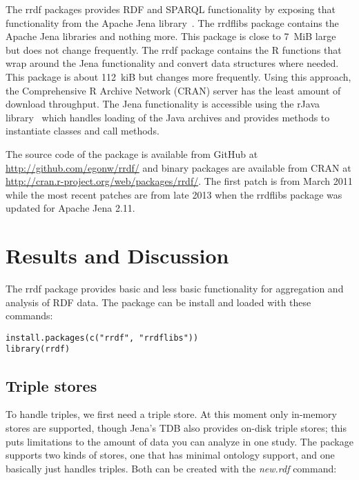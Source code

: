 \documentclass[12pt]{article}
\begin{document}
The rrdf packages provides RDF and SPARQL functionality by exposing that functionality from the
Apache Jena library~\cite{Jena}. The rrdflibs package contains the Apache Jena libraries and
nothing more. This package is close to 7~MiB large but does not change frequently. The rrdf
package contains the R functions that wrap around the Jena functionality and convert data structures
where needed. This package is about 112~kiB but changes more frequently. Using this approach,
the Comprehensive R Archive Network (CRAN) server has the least amount of download throughput.
The Jena functionality is accessible using the rJava library~\cite{RJava} which handles loading
of the Java archives and provides methods to instantiate classes and call methods.

The source code of the package is available from GitHub at \url{http://github.com/egonw/rrdf/} and
binary packages are available from CRAN at \url{http://cran.r-project.org/web/packages/rrdf/}.
The first patch is from March 2011 while the most recent patches are from late 2013 when the
rrdflibs package was updated for Apache Jena 2.11.

\section{Results and Discussion}

The rrdf package provides basic and less basic functionality for aggregation and analysis of RDF data.
The package can be install and loaded with these commands:

\begin{footnotesize}
\begin{verbatim}
install.packages(c("rrdf", "rrdflibs"))
library(rrdf)
\end{verbatim}
\end{footnotesize}

\subsection{Triple stores}

To handle triples, we first need a triple store. At this moment only in-memory stores are
supported, though Jena's TDB also provides on-disk triple stores; this puts limitations to
the amount of data you can analyze in one study.
The package supports two kinds of stores, one that has minimal ontology support, and one
basically just handles triples. Both can be created with the \textit{new.rdf} command:
\end{document}
